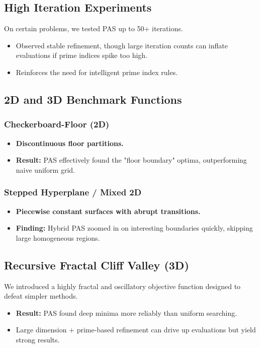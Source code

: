 \documentclass[10pt,twocolumn,letterpaper]{article}
\begin{document}
\subsection{High Iteration Experiments}

On certain problems, we tested PAS up to 50+ iterations.
\begin{itemize}
    \item Observed stable refinement, though large iteration counts can inflate evaluations if prime indices spike too high.
    \item Reinforces the need for intelligent prime index rules.
\end{itemize}

\subsection{2D and 3D Benchmark Functions}

\subsubsection{Checkerboard-Floor (2D)}
\begin{itemize}
    \item \textbf{Discontinuous floor partitions.}
    \item \textbf{Result:} PAS effectively found the "floor boundary" optima, outperforming naive uniform grid.
\end{itemize}

\subsubsection{Stepped Hyperplane / Mixed 2D}
\begin{itemize}
    \item \textbf{Piecewise constant surfaces with abrupt transitions.}
    \item \textbf{Finding:} Hybrid PAS zoomed in on interesting boundaries quickly, skipping large homogeneous regions.
\end{itemize}

\subsection{Recursive Fractal Cliff Valley (3D)}

We introduced a highly fractal and oscillatory objective function designed to defeat simpler methods.
\begin{itemize}
    \item \textbf{Result:} PAS found deep minima more reliably than uniform searching.
    \item Large dimension + prime-based refinement can drive up evaluations but yield strong results.
\end{itemize}
\end{document}
